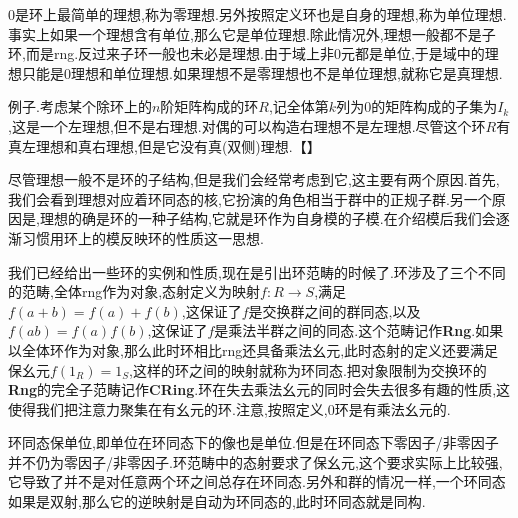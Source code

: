 {0}是环上最简单的理想,称为零理想.另外按照定义环也是自身的理想,称为单位理想.事实上如果一个理想含有单位,那么它是单位理想.除此情况外,理想一般都不是子环,而是rng.反过来子环一般也未必是理想.由于域上非0元都是单位,于是域中的理想只能是0理想和单位理想.如果理想不是零理想也不是单位理想,就称它是真理想.

例子.考虑某个除环上的$n$阶矩阵构成的环$R$,记全体第$k$列为0的矩阵构成的子集为$I_k$,这是一个左理想,但不是右理想.对偶的可以构造右理想不是左理想.尽管这个环$R$有真左理想和真右理想,但是它没有真(双侧)理想.【】

尽管理想一般不是环的子结构,但是我们会经常考虑到它,这主要有两个原因.首先,我们会看到理想对应着环同态的核,它扮演的角色相当于群中的正规子群.另一个原因是,理想的确是环的一种子结构,它就是环作为自身模的子模.在介绍模后我们会逐渐习惯用环上的模反映环的性质这一思想.

我们已经给出一些环的实例和性质,现在是引出环范畴的时候了.环涉及了三个不同的范畴,全体rng作为对象,态射定义为映射$f:R\to S$,满足$f(a+b)=f(a)+f(b)$,这保证了$f$是交换群之间的群同态,以及$f(ab)=f(a)f(b)$,这保证了$f$是乘法半群之间的同态.这个范畴记作\textbf{Rng}.如果以全体环作为对象,那么此时环相比rng还具备乘法幺元,此时态射的定义还要满足保幺元$f(1_R)=1_S$,这样的环之间的映射就称为环同态.把对象限制为交换环的\textbf{Rng}的完全子范畴记作\textbf{CRing}.环在失去乘法幺元的同时会失去很多有趣的性质,这使得我们把注意力聚集在有幺元的环.注意,按照定义,0环是有乘法幺元的.

环同态保单位,即单位在环同态下的像也是单位.但是在环同态下零因子/非零因子并不仍为零因子/非零因子.环范畴中的态射要求了保幺元,这个要求实际上比较强,它导致了并不是对任意两个环之间总存在环同态.另外和群的情况一样,一个环同态如果是双射,那么它的逆映射是自动为环同态的,此时环同态就是同构.

